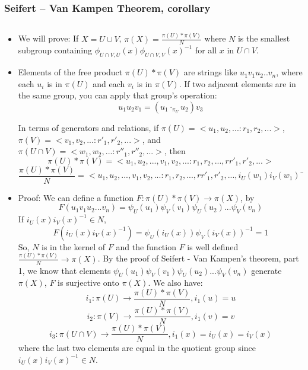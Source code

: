 \documentclass[8pt]{beamer}
\begin{document}
  \begin{frame}
    \frametitle{Seifert -- Van Kampen Theorem, corollary}

    \begin{columns}
      \begin{column}[T]{0.5\textwidth}
        \begin{itemize}
          \item We will prove: If $X = U \cup V$, $\pi(X) = \frac{\pi(U) * \pi(V)}{N}$ where $N$ is the smallest subgroup containing $\phi_{U \cap V, U}(x)\phi_{U \cap V, V}(x)^{-1}$ for all $x$ in $U \cap V$.
          \item Elements of the free product $\pi(U) * \pi(V)$ are strings like $u_1v_1u_2..v_n$, where each $u_i$ is in $\pi(U)$ and each $v_i$ is in $\pi(V)$. If two adjacent elements are in the same group, you can apply that group's operation:
            \[u_1u_2v_1 = (u_1 \cdot_{\pi_U}u_2)v_3\]
            
            In terms of generators and relations, if $\pi(U) = <u_1, u_2, ...: r_1, r_2, ...>$, $\pi(V) = <v_1, v_2, ...: r'_1, r'_2, ...>$, and $\pi(U \cap V) = <w_1, w_2, ...: r''_1, r''_2, ...>$, then
          \[\pi(U)*\pi(V) = <u_1, u_2, ..., v_1, v_2, ... : r_1, r_2, ..., r
            r'_1, r'_2, ...>\]
          \[\frac{\pi(U) * \pi(V)}{N} = <u_1, u_2, ..., v_1, v_2, ... : r_1, r_2, ..., r
            r'_1, r'_2, ..., i_U(w_1)i_V(w_1)^{-1}, i_U(w_2)i_V(w_2)^{-1}, ...>\]

          \item Proof: We can define a function $F : \pi(U) * \pi(V) \rightarrow \pi(X)$, by
            \[F(u_1v_1u_2...v_n) = \psi_U(u_1)\psi_V(v_1)\psi_U(u_2) ... \psi_V(v_n)\]
            If $i_U(x)i_V(x)^{-1} \in N$,
            \[F(i_U(x)i_V(x)^{-1}) = \psi_U(i_U(x))\psi_V(i_V(x))^{-1} = 1\]
            So, $N$ is in the kernel of $F$ and the function $F$ is well defined $\frac{\pi(U)*\pi(V)}{N} \rightarrow \pi(X)$.
            By the proof of Seifert - Van Kampen's theorem, part 1, we know that
            elements $\psi_U(u_1)\psi_V(v_1)\psi_U(u_2) ... \psi_V(v_n)$ generate
            $\pi(X)$, $F$ is surjective onto $\pi(X)$.
            We also have:
            \[i_1: \pi(U) \rightarrow \frac{\pi(U)*\pi(V)}{N}, i_1(u) = u\]
            \[i_2: \pi(V) \rightarrow \frac{\pi(U)*\pi(V)}{N}, i_1(v) = v\]
            \[i_3: \pi(U \cap V) \rightarrow \frac{\pi(U)*\pi(V)}{N}, i_1(x) = i_U(x) = i_V(x)\]
            where the last two elements are equal in the quotient group since $i_U(x)i_V(x)^{-1} \in N$.


\end{itemize}
\end{column}
\end{columns}
\end{frame}
\end{document}

